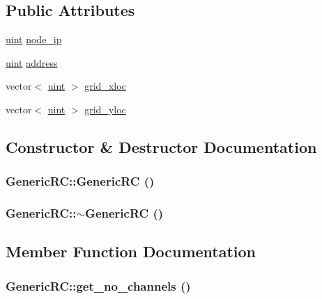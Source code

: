 \subsection*{Public Attributes}
\begin{CompactItemize}
\item 
\hyperlink{outputBuffer_8h_91ad9478d81a7aaf2593e8d9c3d06a14}{uint} \hyperlink{classGenericRC_f937d0d5d2df92a5be2641fb062f312e}{node\_\-ip}
\item 
\hyperlink{outputBuffer_8h_91ad9478d81a7aaf2593e8d9c3d06a14}{uint} \hyperlink{classGenericRC_5a89c8b3e742b017f108ce1075422526}{address}
\item 
vector$<$ \hyperlink{outputBuffer_8h_91ad9478d81a7aaf2593e8d9c3d06a14}{uint} $>$ \hyperlink{classGenericRC_2e2f02ddede7cfafca6073ee559663e2}{grid\_\-xloc}
\item 
vector$<$ \hyperlink{outputBuffer_8h_91ad9478d81a7aaf2593e8d9c3d06a14}{uint} $>$ \hyperlink{classGenericRC_89b5f8d2de4dc45ce64cbb0038ec0efa}{grid\_\-yloc}
\end{CompactItemize}


\subsection{Constructor \& Destructor Documentation}
\hypertarget{classGenericRC_92f9cd6b1dafc9eb0a3a1450448888fe}{
\subsubsection[{GenericRC}]{\setlength{\rightskip}{0pt plus 5cm}GenericRC::GenericRC ()}}
\label{classGenericRC_92f9cd6b1dafc9eb0a3a1450448888fe}


\hypertarget{classGenericRC_f63422fabc3b4393e060ea7ad68981e9}{
\subsubsection[{$\sim$GenericRC}]{\setlength{\rightskip}{0pt plus 5cm}GenericRC::$\sim$GenericRC ()}}
\label{classGenericRC_f63422fabc3b4393e060ea7ad68981e9}




\subsection{Member Function Documentation}
\hypertarget{classGenericRC_6d8e1133e7eefd95a25a4dfe7d45491e}{
\subsubsection[{get\_\-no\_\-channels}]{ GenericRC::get\_\-no\_\-channels ()}}
\label{classGenericRC_6d8e1133e7eefd95a25a4dfe7d45491e}


